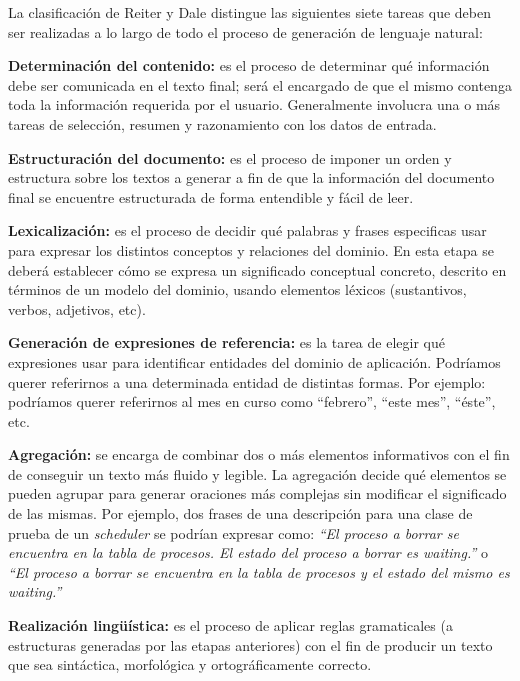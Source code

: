 La clasificación de Reiter y Dale distingue las siguientes siete tareas que deben ser realizadas a lo largo de todo el proceso de generación de lenguaje natural: 

\bigskip
\noindent
\textbf{Determinación del contenido:} es el proceso de determinar qué información debe ser comunicada en el texto final; será el encargado de que el mismo contenga toda la información requerida por el usuario. Generalmente involucra una o más tareas de selección, resumen y razonamiento con los datos de entrada.

\bigskip
\noindent
\textbf{Estructuración del documento:} es el proceso de imponer un orden y estructura sobre los textos a generar a fin de que la información del documento final se encuentre estructurada de forma entendible y fácil de leer.

\bigskip
\noindent
\textbf{Lexicalización:} es el proceso de decidir qué palabras y frases especificas usar para expresar los distintos conceptos y relaciones del dominio. En esta etapa se deberá establecer cómo se expresa un significado conceptual concreto, descrito en términos de un modelo del dominio, usando elementos léxicos (sustantivos, verbos, adjetivos, etc).

\bigskip
\noindent
\textbf{Generación de expresiones de referencia:} es la tarea de elegir qué expresiones usar para identificar entidades del dominio de aplicación. Podríamos querer referirnos a una determinada entidad de distintas formas. Por ejemplo: podríamos querer referirnos al mes en curso como ``febrero'', ``este mes'', ``éste'', etc.

\bigskip
\noindent
\textbf{Agregación:} se encarga de combinar dos o más elementos informativos con el fin de conseguir un texto más fluido y legible. La agregación decide qué elementos se pueden agrupar para generar oraciones más complejas sin modificar el significado de las mismas. Por ejemplo, dos frases de una descripción para una clase de prueba de un \textit{scheduler} se podrían expresar como:
\emph{``El proceso a borrar se encuentra en la tabla de procesos. El estado del proceso a borrar es waiting.''} o \emph{``El proceso a borrar se encuentra en la tabla de procesos y el estado del mismo es waiting.''}

\bigskip
\noindent
\textbf{Realización lingüística:} es el proceso de aplicar reglas gramaticales (a estructuras generadas por las etapas anteriores) con el fin de producir un texto que sea sintáctica, morfológica y ortográficamente correcto.

